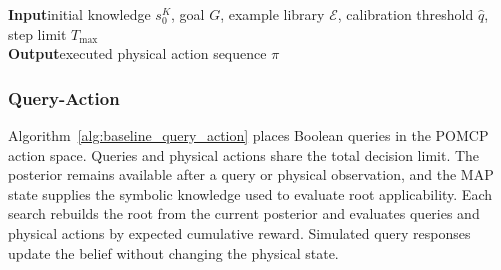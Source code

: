 \begin{algorithm}[H]
\caption{IntroPlan}
\label{alg:baseline_introplan}
\textbf{Input}\quad initial knowledge $s_0^{K}$, goal $G$, example library $\mathcal{E}$, calibration threshold $\hat q$, step limit $T_{\max}$\\
\textbf{Output}\quad executed physical action sequence $\pi$
\BlankLine
{}
\end{algorithm}

\subsubsection{Query-Action}
Algorithm~\ref{alg:baseline_query_action} places Boolean queries in the POMCP action space. Queries and physical actions share the total decision limit. The posterior remains available after a query or physical observation, and the MAP state supplies the symbolic knowledge used to evaluate root applicability. Each search rebuilds the root from the current posterior and evaluates queries and physical actions by expected cumulative reward. Simulated query responses update the belief without changing the physical state.

